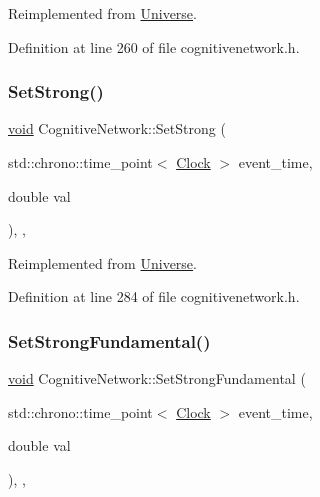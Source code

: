 Reimplemented from \mbox{\hyperlink{class_universe_ae2ae1c3b3e4cde2c18f5f6a814761ec8}{Universe}}.



Definition at line 260 of file cognitivenetwork.\+h.

\mbox{\label{class_cognitive_network_a50f2a12c9873e623d6247318b041ba30}} 
\subsubsection{\texorpdfstring{Set\+Strong()}{SetStrong()}}
{\footnotesize\ttfamily \mbox{\hyperlink{glad_8h_a950fc91edb4504f62f1c577bf4727c29}{void}} Cognitive\+Network\+::\+Set\+Strong (\begin{DoxyParamCaption}\item[{std\+::chrono\+::time\+\_\+point$<$ \mbox{\hyperlink{universe_8h_a0ef8d951d1ca5ab3cfaf7ab4c7a6fd80}{Clock}} $>$}]{event\+\_\+time,  }\item[{double}]{val }\end{DoxyParamCaption})\hspace{0.3cm}{\ttfamily [inline]}, {\ttfamily [final]}, {\ttfamily [virtual]}}



Reimplemented from \mbox{\hyperlink{class_universe_a5946c8f3d4cda305f3ecd10df21a2f94}{Universe}}.



Definition at line 284 of file cognitivenetwork.\+h.

\mbox{\label{class_cognitive_network_ac54286eea279f5caa98b642b9084fd55}} 
\subsubsection{\texorpdfstring{Set\+Strong\+Fundamental()}{SetStrongFundamental()}}
{\footnotesize\ttfamily \mbox{\hyperlink{glad_8h_a950fc91edb4504f62f1c577bf4727c29}{void}} Cognitive\+Network\+::\+Set\+Strong\+Fundamental (\begin{DoxyParamCaption}\item[{std\+::chrono\+::time\+\_\+point$<$ \mbox{\hyperlink{universe_8h_a0ef8d951d1ca5ab3cfaf7ab4c7a6fd80}{Clock}} $>$}]{event\+\_\+time,  }\item[{double}]{val }\end{DoxyParamCaption})\hspace{0.3cm}{\ttfamily [inline]}, {\ttfamily [final]}, {\ttfamily [virtual]}}



